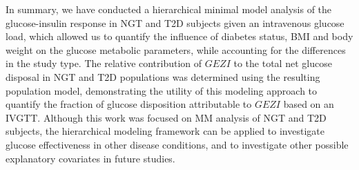 \documentclass[utf8]{frontiersSCNS} %
\begin{document}
In summary, we have conducted a hierarchical minimal model analysis of the glucose-insulin response in NGT and T2D subjects given an intravenous glucose load, which allowed us to quantify the influence of diabetes status, BMI and body weight on the glucose metabolic parameters, while accounting for the differences in the study type. The relative contribution of $GEZI$ to the total net glucose disposal in NGT and T2D populations was determined using the resulting population model, demonstrating the utility of this modeling approach to quantify the fraction of glucose disposition attributable to $GEZI$ based on an IVGTT. Although this work was focused on MM analysis of NGT and T2D subjects, the hierarchical modeling framework can be applied to investigate glucose effectiveness in other disease conditions, and to investigate other possible explanatory covariates in future studies. 


\end{document}
